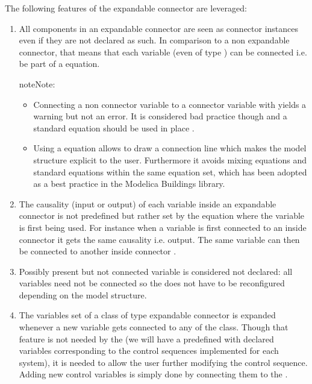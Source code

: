 \documentclass[letterpaper,10pt, openany,english]{sphinxmanual}
\begin{document}
The following features of the expandable connector are leveraged:
\begin{enumerate}
%
\item {} 
All components in an expandable connector are seen as connector instances even if they are not declared as such. In comparison to a non expandable connector, that means that each variable (even of type ) can be connected i.e. be part of a  equation.

\begin{sphinxadmonition}{note}{Note:}\begin{itemize}
\item {} 
Connecting a non connector variable to a connector variable with  yields a warning but not an error. It is considered bad practice though and a standard equation should be used in place .

\item {} 
Using a  equation allows to draw a connection line which makes the model structure explicit to the user. Furthermore it avoids mixing  equations and standard equations within the same equation set, which has been adopted as a best practice in the Modelica Buildings library.

\end{itemize}
\end{sphinxadmonition}

\item {} 
The causality (input or output) of each variable inside an expandable connector is not predefined but rather set by the  equation where the variable is first being used. For instance when a variable is first connected to an inside connector  it gets the same causality i.e. output. The same variable can then be connected to another inside connector  .

\item {} 
Possibly present but not connected variable is considered not declared: all variables need not be connected so the  does not have to be reconfigured depending on the model structure.

\item {} 
The variables set of a class of type expandable connector is expanded whenever a new variable gets connected to any  of the class. Though that feature is not needed by the  (we will have a predefined  with declared variables corresponding to the control sequences implemented for each system), it is needed to allow the user further modifying the control sequence. Adding new control variables is simply done by connecting them to the .

\end{enumerate}
\end{document}
